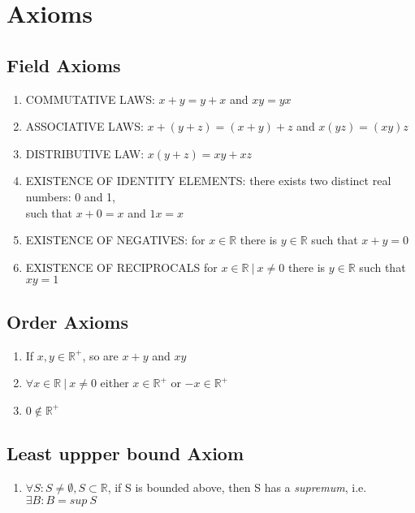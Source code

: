 \documentclass[a4paper, 11pt]{article}
\begin{document}
\section*{Axioms}
\subsection*{Field Axioms}

\begin{enumerate}
  \item COMMUTATIVE LAWS: $x + y = y + x$ and $xy = yx$
  \item ASSOCIATIVE LAWS: $x + (y + z) = (x + y) + z$ and $x(yz) = (xy)z$
  \item DISTRIBUTIVE LAW: $x(y + z) = xy + xz$
  \item EXISTENCE OF IDENTITY ELEMENTS: there exists two distinct real numbers: 0 and 1,\\ such that $x + 0 = x$ and $1x = x$
  \item EXISTENCE OF NEGATIVES: for $x \in \mathbb{R}$ there is $y \in \mathbb{R}$ such that $x + y = 0$
  \item EXISTENCE OF RECIPROCALS for $x \in \mathbb{R} \ | \ x \ne 0$ there is $y \in \mathbb{R}$ such that $xy = 1$
\end{enumerate}

\subsection*{Order Axioms}
\begin{enumerate}
  \item If $x, y \in \mathbb{R}^+$, so are $x + y$ and $xy$
  \item $\forall x \in \mathbb{R} \ | \ x \ne 0$ either $x \in \mathbb{R}^+$ or $-x \in \mathbb{R}^+$ 
  \item $0 \notin \mathbb{R}^+$
\end{enumerate}

\subsection*{Least uppper bound Axiom}
\begin{enumerate}
  \item $\forall S: S \ne \emptyset, S \subset \mathbb{R}$, if S is bounded above, then S has a \emph{supremum}, i.e. $\exists B: B = sup\ S$
\end{enumerate}


\hrulefill
\end{document}
